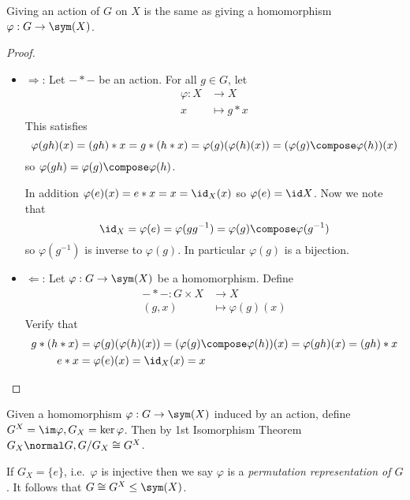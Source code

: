 \documentclass[a4paper]{article}
\theoremstyle{definition}
\begin{document}
\begin{lemma}
  Giving an action of \(G\) on \(X\) is the same as giving a homomorphism \(\varphi: G \to \sym(X)\).
\end{lemma}

\begin{proof}\leavevmode
  \begin{itemize}
  \item \(\Rightarrow\): Let \(- * -\) be an action. For all \(g \in G\), let
    \begin{align*}
      \varphi: X &\to X \\
      x &\mapsto g * x
    \end{align*}
    This satisfies
    \[
      \varphi(gh)(x) = (gh) * x = g * (h * x) = \varphi(g)(\varphi(h)(x)) = (\varphi(g) \compose \varphi(h))(x)
    \]
    so \(\varphi(gh) = \varphi(g) \compose \varphi(h)\).

    In addition \(\varphi(e)(x) = e * x = x = \id_X(x)\) so \(\varphi(e) = \id X\). Now we note that
    \[
      \id_X = \varphi(e) = \varphi(gg^{-1}) = \varphi(g) \compose \varphi(g^{-1})
    \]
    so \(\varphi(g^{-1})\) is inverse to \(\varphi(g)\). In particular \(\varphi(g)\) is a bijection.
  \item \(\Leftarrow\): Let \(\varphi: G \to \sym(X)\) be a homomorphism. Define
    \begin{align*}
      - * -: G \times X &\to X \\
      (g, x) &\mapsto \varphi(g)(x)
    \end{align*}
    Verify that
    \begin{align*}
      g * (h * x) &= \varphi(g)(\varphi(h)(x)) = (\varphi(g) \compose \varphi(h))(x) = \varphi(gh)(x) = (gh) * x \\
      e * x &= \varphi(e)(x) = \id_X(x) = x
    \end{align*}
  \end{itemize}
\end{proof}

Given a homomorphism \(\varphi: G \to \sym(X)\) induced by an action, define \(G^X = \im \varphi, G_X = \ker \varphi\). Then by 1st Isomorphism Theorem \(G_X \normal G, G/G_X \cong G^X\).

If \(G_X = \{e\}\), i.e.\ \(\varphi\) is injective then we say \(\varphi\) is a \emph{permutation representation of \(G\)}. It follows that \(G \cong G^X \leq \sym(X)\).
\end{document}
